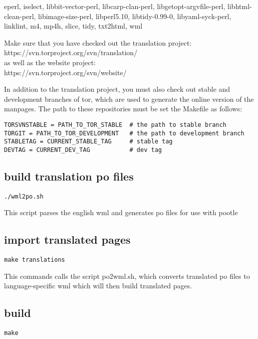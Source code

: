 \documentclass[11pt]{article}
\begin{document}
eperl, iselect, libbit-vector-perl, libcarp-clan-perl,
libgetopt-argvfile-perl, libhtml-clean-perl,
libimage-size-perl, libperl5.10, libtidy-0.99-0,
libyaml-syck-perl, linklint, m4, mp4h, slice, tidy, txt2html, wml

Make sure that you have checked out the translation project: \\
https://svn.torproject.org/svn/translation/ \\
as well as the website project: \\
https://svn.torproject.org/svn/website/

In addition to the translation project, you must also check out stable and development branches of tor, which are used to generate the online version of the manpages. The path to these repositories must be set the Makefile as follows:

\begin{verbatim}
TORSVNSTABLE = PATH_TO_TOR_STABLE  # the path to stable branch
TORGIT = PATH_TO_TOR_DEVELOPMENT   # the path to development branch
STABLETAG = CURRENT_STABLE_TAG     # stable tag
DEVTAG = CURRENT_DEV_TAG           # dev tag
\end{verbatim}

\subsection{build translation po files}
\begin{verbatim}
./wml2po.sh
\end{verbatim}

This script parses the english wml and generates po files for use with pootle
\subsection{import translated pages}
\begin{verbatim}
make translations
\end{verbatim}

This commands calls the script po2wml.sh, which converts translated po files to language-specific wml which will then build translated pages.
\subsection{build}
\begin{verbatim}
make
\end{verbatim}
\end{document}
